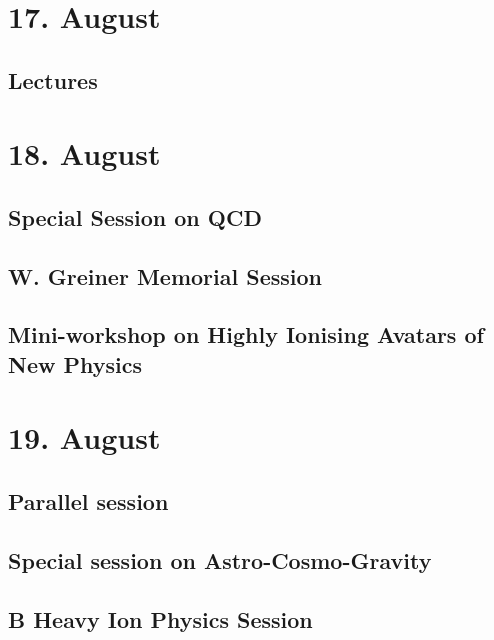 

\tableofcontents
\clearpage
\section{17. August}
\subsection{Lectures}

\clearpage

\section{18. August}
\subsection{Special Session on QCD}

\clearpage

\subsection{W. Greiner Memorial Session}

\clearpage

\subsection{Mini-workshop on Highly Ionising Avatars of New Physics}

\clearpage

\section{19. August}
\subsection{Parallel session}

\clearpage

\subsection{Special session on Astro-Cosmo-Gravity}

\clearpage

\subsection{B Heavy Ion Physics Session}

\clearpage

